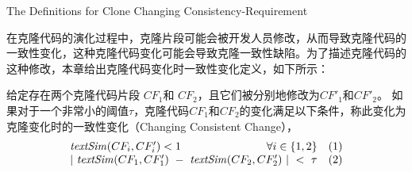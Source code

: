 




{The Definitions for Clone Changing Consistency-Requirement}

在克隆代码的演化过程中，克隆片段可能会被开发人员修改，从而导致克隆代码的一致性变化，这种克隆代码变化可能会导致克隆一致性缺陷。为了描述克隆代码的这种修改，本章给出克隆代码变化时一致性变化定义，如下所示：\\

\begin{definition}
[变化时一致性变化]  
\label{def-changingchange}
给定存在两个克隆代码片段 $CF_1$和 $CF_2$，且它们被分别地修改为$CF'_1$和$CF'_2$。  如果对于一个非常小的阈值$\tau$，克隆代码$CF_1$和$CF_2$的变化满足以下条件，称此变化为克隆变化时的一致性变化（Changing Consistent Change）， 
  \[
  \begin{array}[t]{crl}
    \mathit{textSim}(CF_i, CF'_i) < 1 & \forall i \in \{1,2\} &(1) \\
    \multicolumn{2}{c}{| ~\mathit{textSim}(CF_1,CF'_1)  ~-~ \mathit{textSim}(CF_2,CF'_2) ~| ~< ~ \tau}  & (2)
  \end{array}
  \]
\end{definition}

